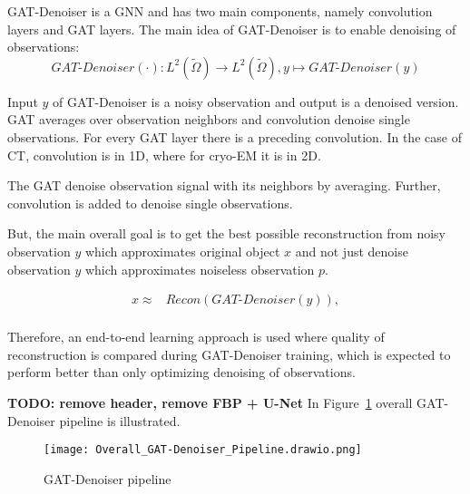 GAT-Denoiser is a GNN and has two main components, namely convolution layers and GAT layers.
The main idea of GAT-Denoiser is to enable denoising of observations:
\begin{equation}
  \textit{GAT-Denoiser} (\cdot) : L^2(\tilde{\Omega}) \to  L^2(\tilde{\Omega}) , y \mapsto \textit{GAT-Denoiser} (y) 
\end{equation}


Input $y$ of GAT-Denoiser is a noisy observation and output is a denoised version.
GAT averages over observation neighbors and convolution denoise single observations. 
For every GAT layer there is a preceding convolution. 
In the case of CT, convolution is in 1D, where for cryo-EM it is in 2D.

\begin{tcolorbox}[colback=red!5!white,colframe=red!75!black]
  The GAT denoise observation signal with its neighbors by averaging. 
  Further, convolution is added to denoise single observations.
\end{tcolorbox}


But, the main overall goal is to get the best possible reconstruction 
from noisy observation $y$ which approximates original object $x$ and 
not just denoise observation $y$ which approximates noiseless observation $p$.


\begin{equation}
  \begin{aligned}
    x \approx   &\textit{Recon} \left( \textit{GAT-Denoiser} \left( y \right) \right), \\
  \end{aligned}
\end{equation}

Therefore, an end-to-end learning approach is used where quality of reconstruction is 
compared during GAT-Denoiser training, which is expected to perform better than 
only optimizing denoising of observations.

\textbf{TODO: remove header, remove FBP + U-Net}
In Figure~\ref{fig:overall-concept} overall GAT-Denoiser pipeline is illustrated.

\begin{figure}[H]
  \centering
  \texttt{[image: Overall\_GAT-Denoiser\_Pipeline.drawio.png]}
  \caption{GAT-Denoiser pipeline}
  \label{fig:overall-concept}
\end{figure}


